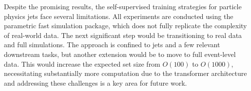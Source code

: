 Despite the promising results, the self-supervised training strategies for particle physics jets face several limitations.
All experiments are conducted using the parametric \delphes fast simulation package, which does not fully replicate the complexity of real-world data.
The next significant step would be transitioning to real data and full simulations.
The approach is confined to jets and a few relevant downstream tasks, but another extension would be to move to full event-level data.
This would increase the expected set size from $O(100)$ to $O(1000)$, necessitating substantially more computation due to the transformer architecture and addressing these challenges is a key area for future work.
